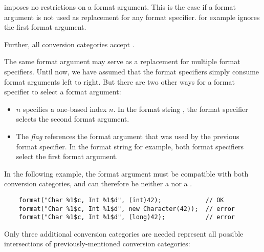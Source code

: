 \begin{description}
\item{} imposes no restrictions on a format argument. This is the case if a
    format argument is not used as replacement for any format specifier.
     for example ignores the first format argument.
\end{description}

\noindent Further, all conversion categories accept .

The same format argument may serve as a replacement for multiple format specifiers.
Until now, we have assumed that the format specifiers simply consume format arguments left to right.
But there are two other ways for a format specifier to select a format argument:

\begin{itemize}
\item $n$\code{\$} specifies a one-based index $n$. In the
    format string , the format specifier selects the
    second format argument.
\item The \code{<} \emph{flag} references the format argument
    that was used by the previous format specifier. In the format string
     for example, both format specifiers select the first
    format argument.
\end{itemize}

\noindent
In the following example,
the format argument must be compatible with both conversion
categories, and can therefore be neither a  nor a .

\begin{Verbatim}
    format("Char %1$c, Int %1$d", (int)42);            // OK
    format("Char %1$c, Int %1$d", new Character(42));  // error
    format("Char %1$c, Int %1$d", (long)42);           // error
\end{Verbatim}

Only three additional conversion categories are needed represent all possible
intersections of previously-mentioned conversion categories:

